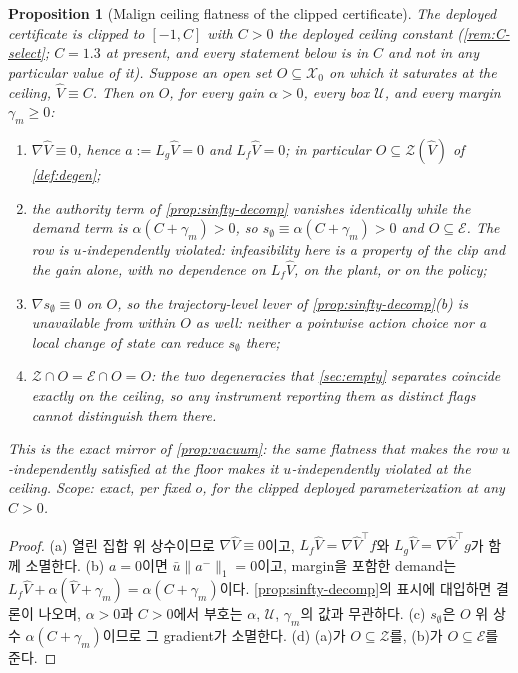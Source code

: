 \documentclass[11pt]{article}
\theoremstyle{plain}
\newtheorem{proposition}[theorem]{Proposition}
\theoremstyle{definition}
\theoremstyle{remark}
\newcommand{\calX}{\mathcal{X}}
\newcommand{\calU}{\mathcal{U}}
\newcommand{\Vhat}{\widehat V}
\newcommand{\Lg}{L_g}
\newcommand{\Lf}{L_f}
\newcommand{\grad}{\nabla}
\newcommand{\bignormone}[1]{\lVert#1\rVert_1}
\newcommand{\eqdef}{:=}
\begin{document}
\begin{proposition}[Malign ceiling flatness of the clipped certificate]\label{prop:ceiling}
The deployed certificate is clipped to $[-1,C]$ with $C>0$ the deployed ceiling constant
(\cref{rem:C-select}; $C=1.3$ at present, and every statement below is in $C$ and not in any
particular value of it). Suppose an open set $O\subseteq\calX_0$ on which it saturates at the
ceiling, $\Vhat\equiv C$. Then on $O$, for \emph{every} gain $\alpha>0$, every box $\calU$, and
every margin $\gamma_m\ge0$:
\begin{enumerate}[label=(\alph*)]
\item $\grad\Vhat\equiv0$, hence $a\eqdef\Lg\Vhat=0$ and $\Lf\Vhat=0$; in particular
$O\subseteq\mathcal Z(\Vhat)$ of \cref{def:degen};
\item the authority term of \cref{prop:sinfty-decomp} vanishes identically while the demand term
is $\alpha(C+\gamma_m)>0$, so
$s_\emptyset\equiv\alpha(C+\gamma_m)>0$ and $O\subseteq\mathcal E$. The row is
$u$-independently \emph{violated}: infeasibility here is a property of the clip and the gain
alone, with no dependence on $\Lf\Vhat$, on the plant, or on the policy;
\item $\grad s_\emptyset\equiv0$ on $O$, so the trajectory-level lever of
\cref{prop:sinfty-decomp}(b) is unavailable from within $O$ as well: neither a pointwise action
choice nor a local change of state can reduce $s_\emptyset$ there;
\item $\mathcal Z\cap O=\mathcal E\cap O=O$: the two degeneracies that \cref{sec:empty}
separates coincide exactly on the ceiling, so any instrument reporting them as distinct flags
cannot distinguish them there.
\end{enumerate}
This is the exact mirror of \cref{prop:vacuum}: the same flatness that makes the row
$u$-independently \emph{satisfied} at the floor makes it $u$-independently \emph{violated} at the
ceiling. Scope: exact, per fixed $o$, for the clipped deployed parameterization at any $C>0$.
\end{proposition}
\begin{proof}
(a) 열린 집합 위 상수이므로 $\grad\Vhat\equiv0$이고, $\Lf\Vhat=\grad\Vhat^\top f$와
$\Lg\Vhat=\grad\Vhat^\top g$가 함께 소멸한다. (b) $a=0$이면
$\bar u\bignormone{a^-}=0$이고, margin을 포함한 demand는 $\Lf\Vhat+\alpha(\Vhat+\gamma_m)
=\alpha(C+\gamma_m)$이다. \cref{prop:sinfty-decomp}의 표시에 대입하면 결론이 나오며,
$\alpha>0$과 $C>0$에서 부호는 $\alpha$, $\calU$, $\gamma_m$의 값과 무관하다. (c)
$s_\emptyset$은 $O$ 위 상수 $\alpha(C+\gamma_m)$이므로 그 gradient가 소멸한다. (d) (a)가
$O\subseteq\mathcal Z$를, (b)가 $O\subseteq\mathcal E$를 준다.
\end{proof}
\end{document}

